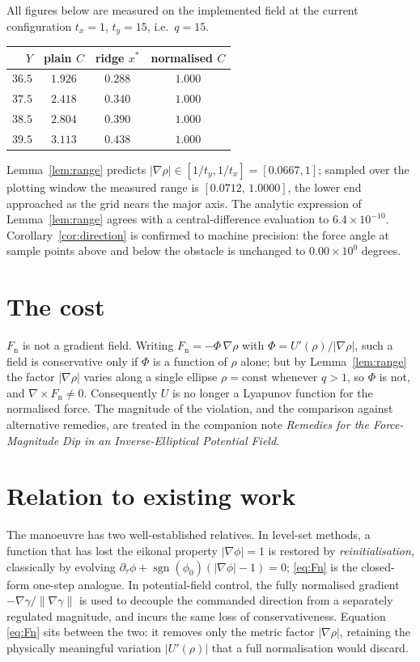 \documentclass[11pt]{article}
\theoremstyle{remark}
\begin{document}
All figures below are measured on the implemented field at the current
configuration $t_{x}=1$, $t_{y}=15$, i.e.\ $q=15$.

\begin{center}
\begin{tabular}{rccc}
\toprule
$Y$ & plain $C$ & ridge $x^{*}$ & normalised $C$\\
\midrule
$36.5$ & $1.926$ & $0.288$ & $\mathbf{1.000}$\\
$37.5$ & $2.418$ & $0.340$ & $\mathbf{1.000}$\\
$38.5$ & $2.804$ & $0.390$ & $\mathbf{1.000}$\\
$39.5$ & $3.113$ & $0.438$ & $\mathbf{1.000}$\\
\bottomrule
\end{tabular}
\end{center}

\noindent
Lemma~\ref{lem:range} predicts $|\nabla\rho|\in[1/t_{y},1/t_{x}]=[0.0667,1]$;
sampled over the plotting window the measured range is $[0.0712,\,1.0000]$,
the lower end approached as the grid nears the major axis. The analytic
expression of Lemma~\ref{lem:range} agrees with a central-difference
evaluation to $6.4\times10^{-10}$. Corollary~\ref{cor:direction} is confirmed
to machine precision: the force angle at sample points above and below the
obstacle is unchanged to $0.00\times10^{0}$ degrees.

\section{The cost}

$F_{\mathrm{n}}$ is not a gradient field. Writing
$F_{\mathrm{n}}=-\Phi\,\nabla\rho$ with $\Phi=U'(\rho)/|\nabla\rho|$, such a
field is conservative only if $\Phi$ is a function of $\rho$ alone; but by
Lemma~\ref{lem:range} the factor $|\nabla\rho|$ varies along a single ellipse
$\rho=\text{const}$ whenever $q>1$, so $\Phi$ is not, and
$\nabla\times F_{\mathrm{n}}\neq0$. Consequently $U$ is no longer a Lyapunov
function for the normalised force. The magnitude of the violation, and the
comparison against alternative remedies, are treated in the companion note
\emph{Remedies for the Force-Magnitude Dip in an Inverse-Elliptical Potential
Field}.

\section{Relation to existing work}

The manoeuvre has two well-established relatives. In level-set methods, a
function that has lost the eikonal property $|\nabla\phi|=1$ is restored by
\emph{reinitialisation}, classically by evolving
$\partial_{\tau}\phi+\operatorname{sgn}(\phi_{0})(|\nabla\phi|-1)=0$;
\eqref{eq:Fn} is the closed-form one-step analogue. In potential-field
control, the fully normalised gradient $-\nabla\gamma/\lVert\nabla\gamma\rVert$
is used to decouple the commanded direction from a separately regulated
magnitude, and incurs the same loss of conservativeness. Equation
\eqref{eq:Fn} sits between the two: it removes only the metric factor
$|\nabla\rho|$, retaining the physically meaningful variation $|U'(\rho)|$
that a full normalisation would discard.
\end{document}
